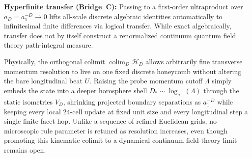 \textbf{Hyperfinite transfer (Bridge~C):} Passing to a first-order ultraproduct over $a_D = a_1^{-D} \to 0$ lifts
all-scale discrete algebraic identities automatically to infinitesimal finite differences via logical transfer. While
exact algebraically, transfer does not by itself construct a renormalized continuum quantum field theory path-integral
measure.

Physically, the orthogonal colimit $\operatorname{colim}_D \mathcal{H}_D$ allows arbitrarily fine transverse momentum
resolution to live on one fixed discrete honeycomb without altering the bare longitudinal beat $U$. Raising the probe
momentum cutoff $\Lambda$ simply embeds the state into a deeper horosphere shell $D_* \sim \log_{a_1}(\Lambda)$ through
the static isometries $V_D$, shrinking projected boundary separations as $a_1^{-D}$ while keeping every local 24-cell
update at fixed unit size and every longitudinal step a single finite facet hop. Unlike a sequence of refined Euclidean
grids, no microscopic rule parameter is retuned as resolution increases, even though promoting this kinematic colimit to
a dynamical continuum field-theory limit remains open.
